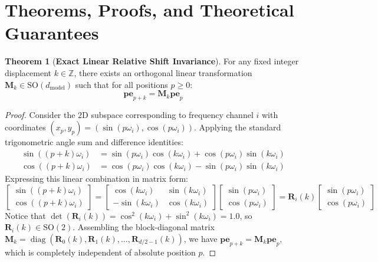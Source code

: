 \documentclass[11pt,a4paper]{article}
\theoremstyle{definition}
\newtheorem{theorem}{\textbf{Theorem}}[section]
\begin{document}
\section{Theorems, Proofs, and Theoretical Guarantees}

\begin{theorem}[\textbf{Exact Linear Relative Shift Invariance}]
For any fixed integer displacement $k \in \mathbb{Z}$, there exists an orthogonal linear transformation $\mathbf{M}_k \in \mathrm{SO}(d_{\text{model}})$ such that for all positions $p \ge 0$:
{\boldmath
\begin{equation}
\mathbf{pe}_{p+k} = \mathbf{M}_k \mathbf{pe}_p
\end{equation}
}
\end{theorem}

\begin{proof}
Consider the 2D subspace corresponding to frequency channel $i$ with coordinates $(x_p, y_p) = (\sin(p\omega_i), \cos(p\omega_i))$.
Applying the standard trigonometric angle sum and difference identities:
{\boldmath
\begin{align}
\sin((p+k)\omega_i) &= \sin(p\omega_i)\cos(k\omega_i) + \cos(p\omega_i)\sin(k\omega_i) \\
\cos((p+k)\omega_i) &= \cos(p\omega_i)\cos(k\omega_i) - \sin(p\omega_i)\sin(k\omega_i)
\end{align}
}
Expressing this linear combination in matrix form:
{\boldmath
\begin{equation}
\begin{bmatrix} \sin((p+k)\omega_i) \\ \cos((p+k)\omega_i) \end{bmatrix} = \begin{bmatrix} \cos(k\omega_i) & \sin(k\omega_i) \\ -\sin(k\omega_i) & \cos(k\omega_i) \end{bmatrix} \begin{bmatrix} \sin(p\omega_i) \\ \cos(p\omega_i) \end{bmatrix} = \mathbf{R}_i(k) \begin{bmatrix} \sin(p\omega_i) \\ \cos(p\omega_i) \end{bmatrix}
\end{equation}
}
Notice that $\det(\mathbf{R}_i(k)) = \cos^2(k\omega_i) + \sin^2(k\omega_i) = 1.0$, so $\mathbf{R}_i(k) \in \mathrm{SO}(2)$.
Assembling the block-diagonal matrix $\mathbf{M}_k = \operatorname{diag}(\mathbf{R}_0(k), \mathbf{R}_1(k), \dots, \mathbf{R}_{d/2-1}(k))$, we have $\mathbf{pe}_{p+k} = \mathbf{M}_k \mathbf{pe}_p$, which is completely independent of absolute position $p$.
\end{proof}
\end{document}
